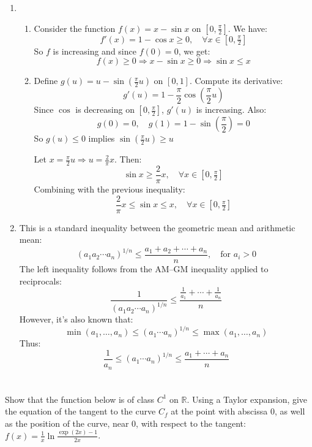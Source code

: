 \documentclass[12pt]{article}
\begin{document}
\begin{answerbox}
  \begin{enumerate}
    \item
    \begin{enumerate}
        \item Consider the function $ f(x) = x - \sin x $ on $[0, \frac{\pi}{2}]$. We have:
        $$
        f'(x) = 1 - \cos x \geq 0,\quad \forall x \in [0, \tfrac{\pi}{2}]
        $$
        So $f$ is increasing and since $f(0) = 0$, we get:
        $$
        f(x) \geq 0 \Rightarrow x - \sin x \geq 0 \Rightarrow \sin x \leq x
        $$

        \item Define $ g(u) = u - \sin\left(\frac{\pi}{2}u \right) $ on $[0,1]$. Compute its derivative:
        $$
        g'(u) = 1 - \frac{\pi}{2} \cos\left( \frac{\pi}{2}u \right)
        $$
        Since $\cos$ is decreasing on $[0, \frac{\pi}{2}]$, $g'(u)$ is increasing. Also:
        $$
        g(0) = 0,\quad g(1) = 1 - \sin\left(\frac{\pi}{2}\right) = 0
        $$
        So $g(u) \leq 0$ implies $ \sin\left(\frac{\pi}{2}u\right) \ge u $

        Let $x = \frac{\pi}{2}u \Rightarrow u = \frac{2}{\pi}x$. Then:
        $$
        \sin x \ge \frac{2}{\pi}x,\quad \forall x \in \left[0, \tfrac{\pi}{2} \right]
        $$
        Combining with the previous inequality:
        $$
        \frac{2}{\pi}x \le \sin x \le x,\quad \forall x \in \left[0, \tfrac{\pi}{2} \right]
        $$
    \end{enumerate}

    \item This is a standard inequality between the geometric mean and arithmetic mean:
    $$
    (a_1 a_2 \cdots a_n)^{1/n} \le \frac{a_1 + a_2 + \cdots + a_n}{n},\quad \text{for } a_i > 0
    $$
    The left inequality follows from the AM–GM inequality applied to reciprocals:
    $$
    \frac{1}{(a_1 a_2 \cdots a_n)^{1/n}} \le \frac{\frac{1}{a_1} + \cdots + \frac{1}{a_n}}{n}
    $$
    However, it's also known that:
    $$
    \min(a_1, \dots, a_n) \le (a_1 \cdots a_n)^{1/n} \le \max(a_1, \dots, a_n)
    $$
    Thus:
    $$
    \frac{1}{a_n} \le (a_1 \cdots a_n)^{1/n} \le \frac{a_1 + \cdots + a_n}{n}
    $$
\end{enumerate}
\end{answerbox}

\newpage

\section{}
Show that the function below is of class $C^1$ on $\mathbb{R}$. Using a Taylor expansion, give the equation of the tangent to the curve $C_f$ at the point with abscissa 0, as well as the position of the curve, near 0, with respect to the tangent:
$f(x) = \frac{1}{x}\ln\frac{\exp(2x) - 1}{2x}$.
\end{document}
